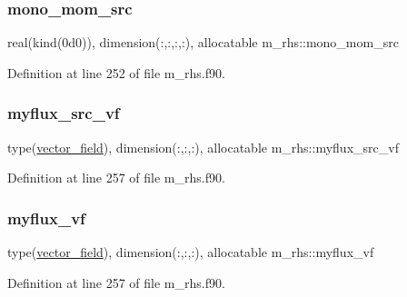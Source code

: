 \mbox{\label{namespacem__rhs_ad2c988fa9d53b74f824dfd0666df27c0}} 
\subsubsection{\texorpdfstring{mono\+\_\+mom\+\_\+src}{mono\_mom\_src}}
{\footnotesize\ttfamily real(kind(0d0)), dimension(\+:,\+:,\+:,\+:), allocatable m\+\_\+rhs\+::mono\+\_\+mom\+\_\+src}



Definition at line 252 of file m\+\_\+rhs.\+f90.

\mbox{\label{namespacem__rhs_affa0b502273a1db4307c4c7d36a088e7}} 
\subsubsection{\texorpdfstring{myflux\+\_\+src\+\_\+vf}{myflux\_src\_vf}}
{\footnotesize\ttfamily type(\hyperlink{structm__derived__types_1_1vector__field}{vector\+\_\+field}), dimension(\+:,\+:,\+:), allocatable m\+\_\+rhs\+::myflux\+\_\+src\+\_\+vf}



Definition at line 257 of file m\+\_\+rhs.\+f90.

\mbox{\label{namespacem__rhs_a32b605d9d7c6a2dd06b13df3beb0b4ce}} 
\subsubsection{\texorpdfstring{myflux\+\_\+vf}{myflux\_vf}}
{\footnotesize\ttfamily type(\hyperlink{structm__derived__types_1_1vector__field}{vector\+\_\+field}), dimension(\+:,\+:,\+:), allocatable m\+\_\+rhs\+::myflux\+\_\+vf}



Definition at line 257 of file m\+\_\+rhs.\+f90.

\mbox{\label{namespacem__rhs_a646c5130e5b695e4eecf0e85a797ba7c}} 
